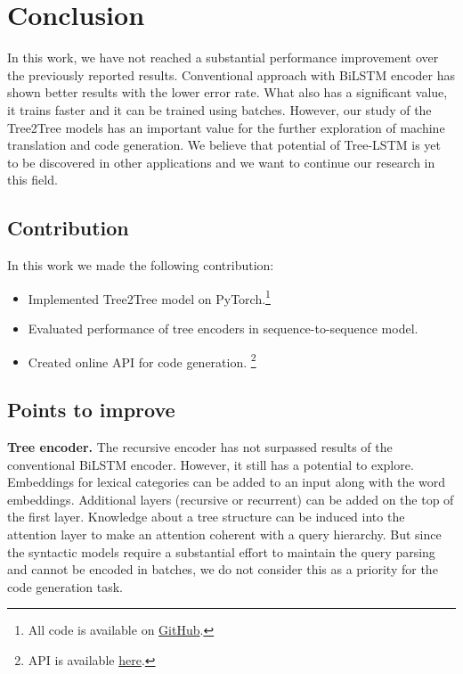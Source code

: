 \chapter{Conclusion} 

\label{Chapter6} 

In this work, we have not reached a substantial performance improvement over the previously reported results. Conventional approach with BiLSTM encoder has shown better results with the lower error rate. What also has a significant value, it trains faster and it can be trained using batches. However, our study of the Tree2Tree models has an important value for the further exploration of machine translation and code generation. We believe that potential of Tree-LSTM is yet to be discovered in other applications and we want to continue our research in this field.

\section{Contribution}
In this work we made the following contribution:
\begin{itemize}
    \item Implemented Tree2Tree model on PyTorch.\footnote{All code is available on \href{https://github.com/tsdaemon/treelstm-code-generation/}{GitHub}.}
    \item Evaluated performance of tree encoders in sequence-to-sequence model.
    \item Created online API for code generation. \footnote{API is available \href{http://daemon-engineer.com/apps/codegen}{here}.}
\end{itemize}

\section{Points to improve} \label{improve}
\textbf{Tree encoder.} The recursive encoder has not surpassed results of the conventional BiLSTM encoder. However, it still has a potential to explore. Embeddings for lexical categories can be added to an input along with the word embeddings. Additional layers (recursive or recurrent) can be added on the top of the first layer. Knowledge about a tree structure can be induced into the attention layer to make an attention coherent with a query hierarchy. But since the syntactic models require a substantial effort to maintain the query parsing and cannot be encoded in batches, we do not consider this as a priority for the code generation task.

